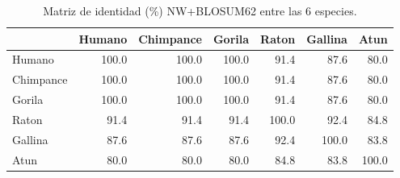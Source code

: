 \begin{table}[h]
\centering
\small
\caption{Matriz de identidad (\%) NW+BLOSUM62 entre las 6 especies.}
\begin{tabular}{lrrrrrr}
\toprule
 & Humano & Chimpance & Gorila & Raton & Gallina & Atun \\
\midrule
Humano & 100.0 & 100.0 & 100.0 & 91.4 & 87.6 & 80.0 \\
Chimpance & 100.0 & 100.0 & 100.0 & 91.4 & 87.6 & 80.0 \\
Gorila & 100.0 & 100.0 & 100.0 & 91.4 & 87.6 & 80.0 \\
Raton & 91.4 & 91.4 & 91.4 & 100.0 & 92.4 & 84.8 \\
Gallina & 87.6 & 87.6 & 87.6 & 92.4 & 100.0 & 83.8 \\
Atun & 80.0 & 80.0 & 80.0 & 84.8 & 83.8 & 100.0 \\
\bottomrule
\end{tabular}
\end{table}